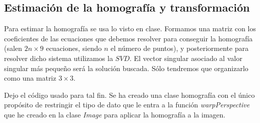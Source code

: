 \documentclass[a4paper, 11pt]{article}
\theoremstyle{definition}
\begin{document}
    \subsection{Estimación de la homografía y transformación}

      Para estimar la homografía se usa lo visto en clase. Formamos una matriz con los
      coeficientes de las ecuaciones que debemos resolver para conseguir la homografía
      (salen $2n \times 9$ ecuaciones, siendo $n$ el número de puntos), y posteriormente
      para resolver dicho sistema utilizamos la $SVD$. El vector singular asociado al valor
      singular más pequeño será la solución buscada. Sólo tendremos que organizarlo como una matriz $3 \times 3$.

      Dejo el código usado para tal fin. Se ha creado una clase homografía con el único
      propósito de restringir el tipo de dato que le entra a la función \textit{warpPerspective}
      que he creado en la clase \textit{Image} para aplicar la homografía a la imagen.
\end{document}
